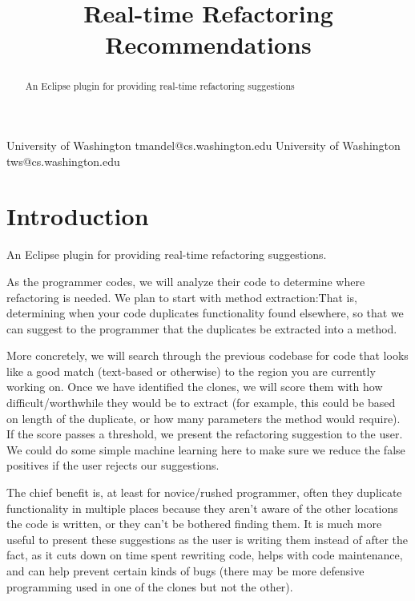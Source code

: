 \documentclass[preprint,10pt]{sigplanconf}
\begin{document}
%

\title{Real-time Refactoring Recommendations}
           {University of Washington}
           {tmandel@cs.washington.edu}
           {University of Washington}
           {tws@cs.washington.edu}
\maketitle
\begin{abstract}
An Eclipse plugin for providing real-time refactoring suggestions
\end{abstract}



\section{Introduction}

An Eclipse plugin for providing real-time refactoring suggestions.

As the programmer codes, we will analyze their code to determine where refactoring is needed. We plan to start with method extraction:That is, determining when your code duplicates functionality found elsewhere, so that we can suggest to the programmer that the duplicates be extracted into a method.

More concretely, we will search through the previous codebase for code that looks like a good match (text-based or otherwise)  to the region you are  currently working on.  Once we have identified the clones, we will score them with how difficult/worthwhile they would be to extract (for example, this could be based on length of the duplicate, or how many parameters the method would require).  If the score passes a threshold, we present the refactoring suggestion to the user.  We could do some simple machine learning here to make sure we reduce the false positives if the user rejects our suggestions.

The chief benefit is, at least for novice/rushed programmer, often they duplicate functionality in multiple places because they aren't aware of the other locations the code is written, or they can't be bothered finding them.  It is much more useful to present these suggestions as the user is writing them instead of after the fact, as it cuts down on time spent rewriting code, helps with code maintenance, and can help prevent certain kinds of bugs (there may be more defensive programming used in one of the clones but not the other).
\end{document}
